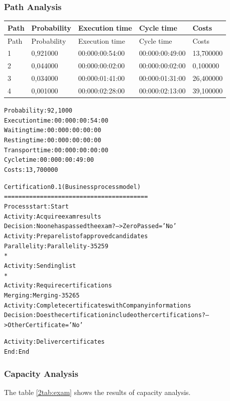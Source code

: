 \subsubsection{Path Analysis}

\begin{table}[ht!]
\centering
\begin{tabular}{|l|l|l|l|l|}
\hline
Path&Probability&Execution time&Cycle time&Costs\\
\hline
Path&Probability&Execution time&Cycle time&Costs\\
\hline
1&0,921000&00:000:00:54:00&00:000:00:49:00&13,700000\\
\hline
2&0,044000&00:000:00:02:00&00:000:00:02:00&0,100000\\
\hline
3&0,034000&00:000:01:41:00&00:000:01:31:00&26,400000\\
\hline
4&0,001000&00:000:02:28:00&00:000:02:13:00&39,100000\\
\hline
\end{tabular}
\end{table}

\begin{alltt}
Probability:   92,1000%
Execution time:  00:000:00:54:00
Waiting time:  00:000:00:00:00
Resting time:  00:000:00:00:00
Transport time:  00:000:00:00:00
Cycle time:  00:000:00:49:00
Costs:  13,700000

Certification 0.1 (Business process model)
========================================
Process start: Start
Activity: Acquire exam results
Decision: No one has passed the exam? --> ZeroPassed='No'
Activity: Prepare list of approved candidates
Parallelity: Parallelity-35259
    *
    Activity: Sending list
    *
    Activity: Require certifications
Merging: Merging-35265
Activity: Complete certificates with Company informations
Decision: Does the certification include other certifications? --> OtherCertificate='No'

Activity: Deliver certificates
End: End
\end{alltt}

\subsubsection{Capacity Analysis}
The table \ref{2tab:exam} shows the results of capacity analysis.

